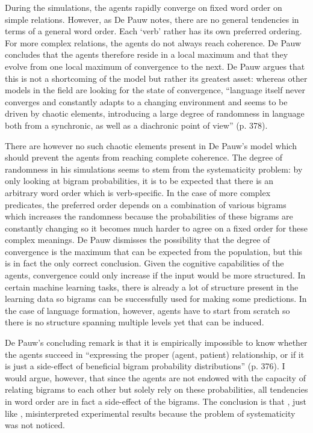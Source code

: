 During the simulations, the agents rapidly converge on fixed word order on simple relations. However, as De Pauw notes, there are no general tendencies in terms of a general word order. Each `verb' rather has its own preferred ordering. For more complex relations, the agents do not always reach coherence. De Pauw concludes that the agents therefore reside in a local maximum and that they evolve from one local maximum of convergence to the next. De Pauw argues that this is not a shortcoming of the model but rather its greatest asset: whereas other models in the field are looking for the state of convergence,  ``language itself never converges and constantly adapts to a changing environment and seems to be driven by chaotic elements, introducing a large degree of randomness in language both from a synchronic, as well as a diachronic point of view''  (p. 378).

There are however no such chaotic elements present in De Pauw's model which should prevent the agents from reaching complete coherence. The degree of randomness in his simulations seems to stem from the systematicity problem: by only looking at bigram probabilities, it is to be expected that there is an arbitrary word order which is verb-specific. In the case of more complex predicates, the preferred order depends on a combination of various bigrams which increases the randomness because the probabilities of these bigrams are constantly changing so it becomes much harder to agree on a fixed order for these complex meanings. De Pauw dismisses the possibility that the degree of convergence is the maximum that can be expected from the population, but this is in fact the only correct conclusion. Given the cognitive capabilities of the agents, convergence could only increase if the input would be more structured. In certain machine learning tasks, there is already a lot of structure present in the learning data so bigrams can be successfully used for making some predictions. In the case of language formation, however, agents have to start from scratch so there is no structure spanning multiple levels yet that can be induced.

De Pauw's concluding remark is that it is empirically impossible to know whether the agents succeed in  ``expressing the proper (agent, patient) relationship, or if it is just a side-effect of beneficial bigram probability distributions''  (p. 376). I would argue, however, that since the agents are not endowed with the capacity of relating bigrams to each other but solely rely on these probabilities, all tendencies in word order are in fact a side-effect of the bigrams. The conclusion is that \citet{depauw02grael}, just like \citet{batali02negotiation}, misinterpreted experimental results because the problem of systematicity was not noticed.


